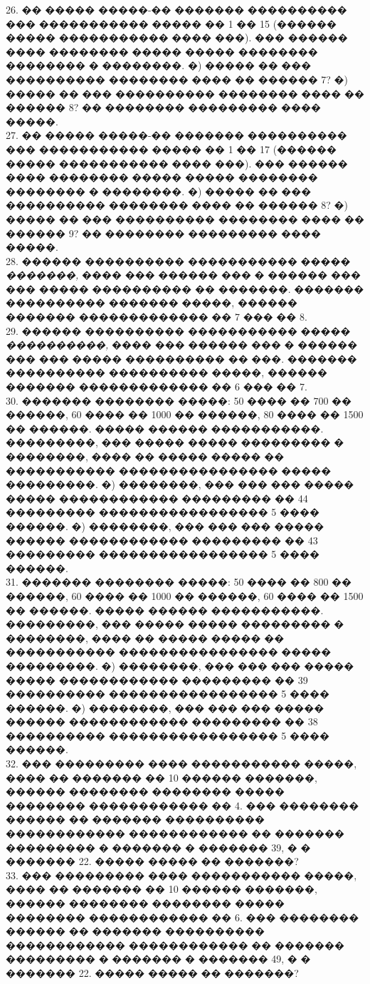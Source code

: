 \documentclass[12pt]{article}
\begin{document}
26. �� ����� �����-�� ������� ���������� ��� ����������� ����� �� 1 �� 15 (������ ����� ����������� ���� ���). ��� ������ ���� �������� ����� ����� �������� �������� � ��������. �) ����� �� ��� ���������� �������� ���� �� ������ 7? �) ����� �� ��� ���������� �������� ���� �� ������ 8? �� �������� ��������� ���� �����.\\
27. �� ����� �����-�� ������� ���������� ��� ����������� ����� �� 1 �� 17 (������ ����� ����������� ���� ���). ��� ������ ���� �������� ����� ����� �������� �������� � ��������. �) ����� �� ��� ���������� �������� ���� �� ������ 8? �) ����� �� ��� ���������� �������� ���� �� ������ 9? �� �������� ��������� ���� �����.\\
28. ������ ���������� ����������� ����� {\it �������,} ���� ��� ������ ��� � ������ ��� ��� ����� ���������� �� �������. ������� ���������� ������� �����, ������ ������� ������������� �� 7 ��� �� 8.\\
29. ������ ���������� ����������� ����� {\it ����������,} ���� ��� ������ ��� � ������ ��� ��� ����� ���������� �� ���. ������� ���������� ���������� �����, ������ ������� ������������� �� 6 ��� �� 7.\\
30. ������� �������� �����: 50 ���� �� 700 �� ������, 60 ���� �� 1000 �� ������, 80 ���� �� 1500 �� ������. ����� ������ �����������. ���������, ��� ����� ����� ��������� � ��������, ���� �� ����� ����� �� ����������� ���������������� ����� ���������. �) ��������, ��� ��� ��� ����� ����� ������������ ��������� �� 44 ��������� ����������������� 5 ���� ������. �) ��������, ��� ��� ��� ����� ������ ������������ ��������� �� 43 ��������� ����������������� 5 ���� ������.\\
31. ������� �������� �����: 50 ���� �� 800 �� ������, 60 ���� �� 1000 �� ������, 60 ���� �� 1500 �� ������. ����� ������ �����������. ���������, ��� ����� ����� ��������� � ��������, ���� �� ����� ����� �� ����������� ���������������� ����� ���������. �) ��������, ��� ��� ��� ����� ����� ������������ ��������� �� 39 ���������� ����������������� 5 ���� ������. �) ��������, ��� ��� ��� ����� ������ ������������ ��������� �� 38 ���������� ����������������� 5 ���� ������.\\
32. ��� ��������� ���� ����������� �����, ���� �� ������� �� 10 ������ �������, ������ �������� �������� ����� �������� ������������ �� 4. ��� �������� ������ �� ������� ���������� ������������ ������������ �� ������� ��������� � ������� � ������� 39, � � ������� 22. ����� ����� �� �������?\\
33. ��� ��������� ���� ����������� �����, ���� �� ������� �� 10 ������ �������, ������ �������� �������� ����� �������� ������������ �� 6. ��� �������� ������ �� ������� ���������� ������������ ������������ �� ������� ��������� � ������� � ������� 49, � � ������� 22. ����� ����� �� �������?\\
\end{document}
